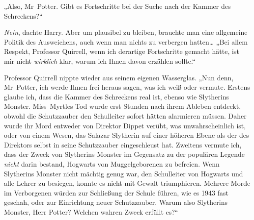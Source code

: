 „Also, Mr~Potter. Gibt es Fortschritte bei der Suche nach der Kammer des Schreckens?“

\emph{Nein}, dachte Harry. Aber um plausibel zu bleiben, brauchte man eine allgemeine Politik des Ausweichens, auch wenn man nichts zu verbergen hatten… „Bei allem Respekt, Professor Quirrell, wenn ich derartige Fortschritte gemacht hätte, ist mir nicht \emph{wirklich} klar, warum ich Ihnen davon erzählen sollte.“

Professor Quirrell nippte wieder aus seinem eigenen Wasserglas. „Nun denn, Mr~Potter, ich werde Ihnen frei heraus sagen, was ich weiß oder vermute. Erstens glaube ich, dass die Kammer des Schreckens real ist, ebenso wie Slytherins Monster. Miss~Myrtles Tod wurde erst Stunden nach ihrem Ableben entdeckt, obwohl die Schutzzauber den Schulleiter sofort hätten alarmieren müssen. Daher wurde ihr Mord entweder von Direktor Dippet verübt, was unwahrscheinlich ist, oder von einem Wesen, das Salazar Slytherin auf einer höheren Ebene als der des Direktors selbst in seine Schutzzauber eingeschleust hat. Zweitens vermute ich, dass der Zweck von Slytherins Monster im Gegensatz zu der populären Legende \emph{nicht} darin bestand, Hogwarts von Muggelgeborenen zu befreien. Wenn Slytherins Monster nicht mächtig genug war, den Schulleiter von Hogwarts und alle Lehrer zu besiegen, konnte es nicht mit Gewalt triumphieren. Mehrere Morde im Verborgenen würden zur Schließung der Schule führen, wie es 1943 fast geschah, oder zur Einrichtung neuer Schutzzauber. Warum also Slytherins Monster, Herr Potter? Welchen wahren Zweck erfüllt es?“

